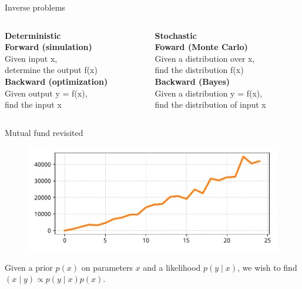 \documentclass[12pt, aspectratio=149]{beamer}
\theoremstyle{plain}
\begin{document}
\begin{frame}[fragile]{Inverse problems}
\begin{columns}
\begin{column}{0.5\textwidth}
    \begin{center}
\textbf{Deterministic}\\
\vspace*{2em}
\textbf{Forward (simulation)} \\
Given input x,\\determine the output f(x) \\
\vspace*{1em}
\textbf{Backward (optimization)} \\
Given output y = f(x),\\find the input x
     \end{center}
\end{column}
\begin{column}{0.5\textwidth}  %
    \begin{center}
\textbf{Stochastic}\\
\vspace*{2em}
\textbf{Foward (Monte Carlo)} \\
Given a distribution over x,\\find the distribution f(x) \\
\vspace*{1em}
\textbf{Backward (Bayes)} \\
Given a distribution y = f(x),\\find the distribution of input x
     \end{center}
\end{column}
\end{columns}
\end{frame}


\begin{frame}[fragile]{Mutual fund revisited}
\vspace*{-1em}
\begin{center}
 \begin{figure}
    	\centering
    	\includegraphics[width=0.99\linewidth]{figures/esmda_observations.pdf}
 \end{figure}
 Given a prior $p(x)$ on parameters $x$ and a likelihood $p(y \mid x)$,
 we wish to find $(x \mid y) \propto p(y \mid x) p(x)$.
 \end{center}
\end{frame}
\end{document}
